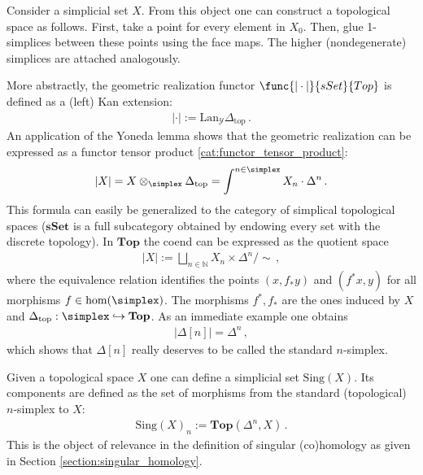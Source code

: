     \begin{example}\label{model:geometric_realization}
        Consider a simplicial set $X$. From this object one can construct a topological space as follows. First, take a point for every element in $X_0$. Then, glue 1-simplices between these points using the face maps. The higher (nondegenerate) simplices are attached analogously.

        More abstractly, the geometric realization functor $\func{|\cdot|}{sSet}{Top}$ is defined as a (left) Kan extension:
        \begin{gather}
            |\cdot| := \mathrm{Lan}_{\mathcal{Y}}\Delta_\mathrm{top}\,.
        \end{gather}
        An application of the Yoneda lemma shows that the geometric realization can be expressed as a functor tensor product \ref{cat:functor_tensor_product}:
        \begin{gather}
            |X| = X\otimes_\simplex\Delta_\mathrm{top}=\int^{n\in\simplex}X_n\cdot\Delta^n\,.
        \end{gather}
        This formula can easily be generalized to the category of simplical topological spaces ($\mathbf{sSet}$ is a full subcategory obtained by endowing every set with the discrete topology). In $\mathbf{Top}$ the coend can be expressed as the quotient space
        \begin{gather}
            |X| := \bigsqcup_{n\in\mathbb{N}}X_n\times\Delta^n/\sim\,,
        \end{gather}
        where the equivalence relation identifies the points $(x,f_*y)$ and $(f^*x,y)$ for all morphisms $f\in\mathrm{hom}(\simplex)$. The morphisms $f^*,f_*$ are the ones induced by $X$ and $\Delta_\mathrm{top}:\simplex\hookrightarrow\mathbf{Top}$.
        As an immediate example one obtains
        \begin{gather}
            |\Delta[n]| = \Delta^n\,,
        \end{gather}
        which shows that $\Delta[n]$ really deserves to be called the standard $n$-simplex.
    \end{example}
    \begin{example}\label{model:singular_set}
        Given a topological space $X$ one can define a simplicial set $\mathrm{Sing}(X)$. Its components are defined as the set of morphisms from the standard (topological) $n$-simplex to $X$:
        \begin{gather}
            \mathrm{Sing}(X)_n := \mathbf{Top}(\Delta^n,X)\,.
        \end{gather}
        This is the object of relevance in the definition of singular (co)homology as given in Section \ref{section:singular_homology}.
    \end{example}

